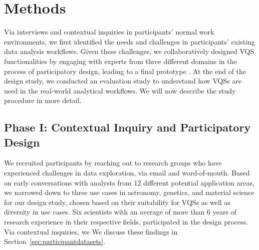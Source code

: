   \section{Methods\label{sec:methods}}
  Via interviews and contextual inquiries in participants' normal work environments, we first identified the needs and challenges in participants' existing data analysis workflows. Given these challenges, we collaboratively designed VQS functionalities by engaging with experts from three different domains in the process of participatory design, leading to a final prototype \zvpp. At the end of the design study, we conducted an evaluation study to understand how VQSs are used in the real-world analytical workflows. We will now describe the study procedure in more detail.
  \subsection{Phase I: Contextual Inquiry and Participatory Design}
  \par We recruited participants by reaching out to research groups who have experienced challenges in data exploration, via email and word-of-mouth. Based on early conversations with analysts from 12 different potential application areas, we narrowed down to three use cases in astronomy, genetics, and material science for our design study, chosen based on their suitability for VQSs as well as diversity in use cases. Six scientists  with an average of more than 6 years of research experience in their respective fields, participated in the design process. Via  contextual inquiries, we  We discuss these findings in Section~\ref{sec:participantdatasets}.%

